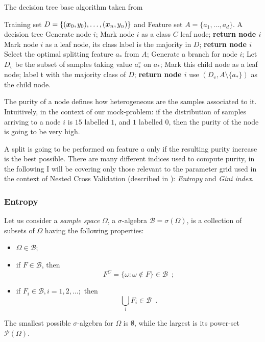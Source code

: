 \begin{algorithm}
	\caption{The decision tree base algorithm taken from
		\cite{ZhouZhi-Hua2021ML}}\label{algo:decision-tree}
	\begin{algorithmic}[1]
		\Require Training set $D = \{(\boldsymbol{x}_0, y_0), \allowbreak\ldots\allowbreak, (\boldsymbol{x}_n, y_n)\}$ and Feature set $A = \{a_1, \ldots,
			a_d\}$.
		\Ensure A decision tree
		\State Generate node $i$;
		\State Mark node $i$ as a class $C$ leaf node; \textbf{return node $i$}
		\EndIf
		\State Mark node $i$ as a leaf node, its class label is
		the majority in $D$;
		\State \textbf{return node $i$}
		\EndIf
		\State Select the optimal splitting feature $a_*$ from $A$;
		\State Generate a branch for node $i$;
		\State Let $D_v$ be the subset of samples taking value $a_*^v$ on $a_*$;
		\State Mark this child node as a leaf node;
		\State label t with the majority class of $D$;
		\textbf{return node $i$}
		\Else
		\State use $(D_v, A \setminus \{a_*\})$ as the child node.
		\EndIf
		\EndFor
		\EndFunction
	\end{algorithmic}
\end{algorithm}

The purity of a node defines how heterogeneous are the samples associated to it. Intuitively, in the
context of our mock-problem: if the distribution of samples arriving to a node $i$ is $15$ labelled
$1$, and $1$ labelled $0$, then the purity of the node is going to be very high.

A split is going to be performed on feature $a$ only if the resulting purity increase is the best
possible. There are many different indices used to compute purity, in the following I will be
covering only those relevant to the parameter grid used in the context of Nested Cross Validation
(described in ): \emph{Entropy} and \emph{Gini index}.

\subsubsection{Entropy}
Let us consider a \emph{sample space} $\Omega$, a $\sigma$-algebra $\mathcal{B} = \sigma(\Omega)$,
is a collection of subsets of $\Omega$ having the following properties:
\begin{itemize}
	\item $\Omega \in \mathcal{B}$;
	\item if $F \in \mathcal{B}$, then \[F^C = \{\omega: \omega \notin F\} \in \mathcal{B}
		\enspace;\]
	\item if $F_i \in \mathcal{B}, i = 1, 2, \ldots;$ then \[\bigcup_i{F_i} \in \mathcal{B}
		\enspace.\]
\end{itemize}
The smallest possible $\sigma$-algebra for $\Omega$ is $\emptyset$, while the largest is its power-set
$\mathcal{P}(\Omega)$.

